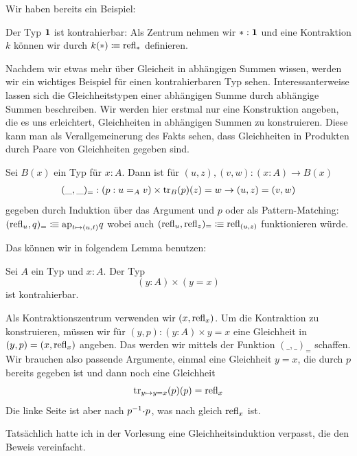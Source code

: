 Wir haben bereits ein Beispiel:
\begin{beispiel}
  Der Typ $\mathbf{1}$ ist kontrahierbar: Als Zentrum nehmen wir $\ast:\mathbf{1}$ und
  eine Kontraktion $k$ können wir durch $k(\ast)\vcentcolon\mspace{-1.2mu}\equiv \mathrm{refl}_\ast$ definieren.
\end{beispiel}

Nachdem wir etwas mehr über Gleicheit in abhängigen Summen wissen, werden wir ein wichtiges Beispiel für einen kontrahierbaren Typ sehen.
Interessanterweise lassen sich die Gleichheitstypen einer abhängigen Summe durch abhängige Summen beschreiben.
Wir werden hier erstmal nur eine Konstruktion angeben, die es uns erleichtert, Gleichheiten in abhängigen Summen zu konstruieren.
Diese kann man als Verallgemeinerung des Fakts sehen, dass Gleichheiten in Produkten durch Paare von Gleichheiten gegeben sind.

\begin{definition}
  Sei $B(x)$ ein Typ für $x:A$.
  Dann ist für $(u,z),(v,w):(x:A)\to B(x)$ 
  \begin{align*}
    (\_,\_)_=:(p:u=_Av)\times \mathrm{tr}_B(p)(z)=w \to (u,z)=(v,w)
  \end{align*}
  gegeben durch Induktion über das Argument und $p$ oder als Pattern-Matching:
  $(\mathrm{refl}_u,q)_=\vcentcolon\mspace{-1.2mu}\equiv \mathrm{ap}_{t\mapsto (u,t)}q$ wobei auch $(\mathrm{refl}_u,\mathrm{refl}_z)_=\vcentcolon\mspace{-1.2mu}\equiv \mathrm{refl}_{(u,z)}$ funktionieren würde.
\end{definition}

Das können wir in folgendem Lemma benutzen:

\begin{lemma}
  Sei $A$ ein Typ und $x:A$.
  Der Typ
  \[
     (y:A)\times (y=x)
  \]
  ist kontrahierbar.
\end{lemma}

\begin{beweis}
  Als Kontraktionszentrum verwenden wir $(x,\mathrm{refl}_x)$.
  Um die Kontraktion zu konstruieren, müssen wir für $(y,p):(y:A)\times y=x$ eine Gleichheit in
  $(y,p)=(x,\mathrm{refl}_x)$ angeben.
  Das werden wir mittels der Funktion $(\_,\_)_=$ schaffen.
  Wir brauchen also passende Argumente, einmal eine Gleichheit $y=x$, die durch $p$ bereits gegeben ist und dann noch eine Gleichheit
  \[
    \mathrm{tr}_{y\mapsto y=x}(p)(p)=\mathrm{refl}_x
  \]
  Die linke Seite ist aber nach  $p^{-1}\kon p$,
  was nach  gleich $\mathrm{refl}_x$ ist.
\end{beweis}

Tatsächlich hatte ich in der Vorlesung eine Gleichheitsinduktion verpasst, die den Beweis vereinfacht.

